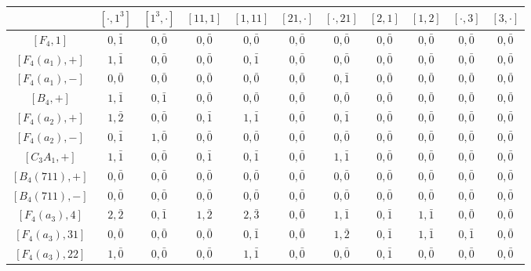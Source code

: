 \begin{landscape}
    \begin{table}[!ht]
        \centering
        {\small
        \begin{tabular}{|c|cccccccccc|}
            \hline
        & $[\cdot,1^3]$ & $[1^3,\cdot]$ & $[11,1]$ & $[1,11]$ & $[21,\cdot]$ & $[\cdot,21]$ & $[2,1]$ & $[1,2]$ & $[\cdot, 3]$ & $[3,\cdot]$ \\\hline
        $[F_4,1]$ & $0,\bar1$ & $0,\bar0$ & $0,\bar0$ & $0,\bar0$ & $0,\bar0$ & $0,\bar0$ & $0,\bar0$ & $0,\bar0$ & $0,\bar0$ & $0,\bar0$ \\\hline
        $[F_4(a_1),+]$ & $1,\bar1$ & $0,\bar0$ & $0,\bar0$ & $0,\bar1$ & $0,\bar0$ & $0,\bar0$ & $0,\bar0$ & $0,\bar0$ & $0,\bar0$ & $0,\bar0$ \\
        $[F_4(a_1),-]$ & $0,\bar0$ & $0,\bar0$ & $0,\bar0$ & $0,\bar0$ & $0,\bar0$ & $0,\bar1$ & $0,\bar0$ & $0,\bar0$ & $0,\bar0$ & $0,\bar0$ \\
        $[B_4,+]$ & $1,\bar1$ & $0,\bar1$ & $0,\bar0$ & $0,\bar0$ & $0,\bar0$ & $0,\bar0$ & $0,\bar0$ & $0,\bar0$ & $0,\bar0$ & $0,\bar0$ \\\hline
        $[F_4(a_2),+]$ & $1,\bar2$ & $0,\bar0$ & $0,\bar1$ & $1,\bar1$ & $0,\bar0$ & $0,\bar1$ & $0,\bar0$ & $0,\bar0$ & $0,\bar0$ & $0,\bar0$ \\
        $[F_4(a_2),-]$ & $0,\bar1$ & $1,\bar0$ & $0,\bar0$ & $0,\bar0$ & $0,\bar0$ & $0,\bar0$ & $0,\bar0$ & $0,\bar0$ & $0,\bar0$ & $0,\bar0$ \\
        $[C_3A_1,+]$ & $1,\bar1$ & $0,\bar0$ & $0,\bar1$ & $0,\bar1$ & $0,\bar0$ & $1,\bar1$ & $0,\bar0$ & $0,\bar0$ & $0,\bar0$ & $0,\bar0$ \\\hline
        $[B_4(711),+]$ & $0,\bar0$ & $0,\bar0$ & $0,\bar0$ & $0,\bar0$ & $0,\bar0$ & $0,\bar0$ & $0,\bar0$ & $0,\bar0$ & $0,\bar0$ & $0,\bar0$ \\
        $[B_4(711),-]$ & $0,\bar0$ & $0,\bar0$ & $0,\bar0$ & $0,\bar0$ & $0,\bar0$ & $0,\bar0$ & $0,\bar0$ & $0,\bar0$ & $0,\bar0$ & $0,\bar0$ \\\hline
        $[F_4(a_3),4]$ & $2,\bar2$ & $0,\bar1$ & $1,\bar2$ & $2,\bar{3}$ & $0,\bar0$ & $1,\bar1$ & $0,\bar1$ & $1,\bar1$ & $0,\bar0$ & $0,\bar0$ \\
        $[F_4(a_3),31]$ & $0,\bar0$ & $0,\bar0$ & $0,\bar0$ & $0,\bar1$ & $0,\bar0$ & $1,\bar2$ & $0,\bar1$ & $1,\bar1$ & $0,\bar1$ & $0,\bar0$ \\
        $[F_4(a_3),22]$ & $1,\bar0$ & $0,\bar0$ & $0,\bar0$ & $1,\bar1$ & $0,\bar0$ & $0,\bar0$ & $0,\bar1$ & $0,\bar0$ & $0,\bar0$ & $0,\bar0$ \\

\end{tabular}}
\end{table}
\end{landscape}
